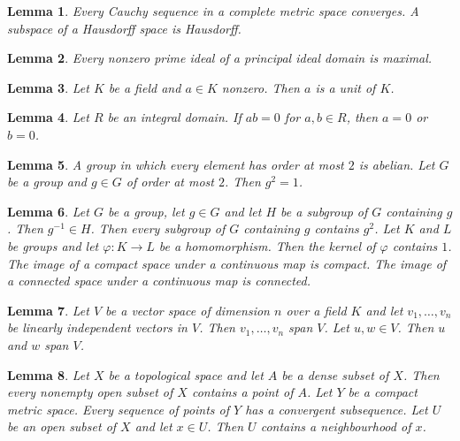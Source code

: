 \documentclass{article}
\newtheorem{lemma}{Lemma}
\begin{document}
\begin{lemma}\label{subspaces-of-spaces}
Every Cauchy sequence in a complete metric space converges. A subspace of a Hausdorff space is Hausdorff.
\end{lemma}

\begin{lemma}\label{nonzero-prime}
Every nonzero prime ideal of a principal ideal domain is maximal.
\end{lemma}

\begin{lemma}\label{elided-adjective}
Let $K$ be a field and $a\in K$ nonzero. Then $a$ is a unit of $K$.
\end{lemma}

\begin{lemma}\label{if-for}
Let $R$ be an integral domain. If $ab=0$ for $a,b\in R$, then $a=0$ or $b=0$.
\end{lemma}

\begin{lemma}\label{in-which}
A group in which every element has order at most $2$ is abelian. Let $G$ be a group and $g\in G$ of order at most $2$. Then $g^2=1$.
\end{lemma}

\begin{lemma}\label{containing}
Let $G$ be a group, let $g\in G$ and let $H$ be a subgroup of $G$ containing $g$. Then $g^{-1}\in H$. Then every subgroup of $G$ containing $g$ contains $g^2$. Let $K$ and $L$ be groups and let $\varphi\colon K\to L$ be a homomorphism. Then the kernel of $\varphi$ contains $1$. The image of a compact space under a continuous map is compact. The image of a connected space under a continuous map is connected.
\end{lemma}

\begin{lemma}\label{families-span}
Let $V$ be a vector space of dimension $n$ over a field $K$ and let $v_1,\ldots,v_n$ be linearly independent vectors in $V$. Then $v_1,\ldots,v_n$ span $V$. Let $u,w\in V$. Then $u$ and $w$ span $V$.
\end{lemma}

\begin{lemma}\label{points-of-spaces}
Let $X$ be a topological space and let $A$ be a dense subset of $X$. Then every nonempty open subset of $X$ contains a point of $A$. Let $Y$ be a compact metric space. Every sequence of points of $Y$ has a convergent subsequence. Let $U$ be an open subset of $X$ and let $x\in U$. Then $U$ contains a neighbourhood of $x$.
\end{lemma}
\end{document}
